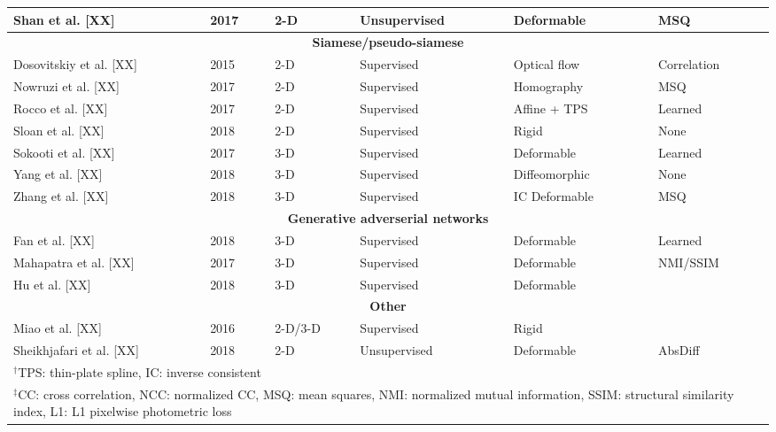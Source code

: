 \begin{table}[!htb]
\begin{tabular*}{\textwidth}{l@{\extracolsep{\fill}}l@{\extracolsep{\fill}}l@{\extracolsep{\fill}}l@{\extracolsep{\fill}}l@{\extracolsep{\fill}}l}
  Shan et al. [XX] & 2017 & 2-D & Unsupervised & Deformable & MSQ \\
\midrule
\multicolumn{6}{c}{\textbf{Siamese/pseudo-siamese}}
  \vspace{0.25cm} \\
  Dosovitskiy et al. [XX] & 2015 & 2-D & Supervised & Optical flow & Correlation \\
  Nowruzi et al. [XX] & 2017 & 2-D & Supervised & Homography & MSQ \\
  Rocco et al. [XX] & 2017 & 2-D & Supervised & Affine + TPS & Learned \\
  Sloan et al. [XX] & 2018 & 2-D & Supervised & Rigid & None \\  %
  Sokooti et al. [XX] & 2017 & 3-D & Supervised & Deformable & Learned \\
  Yang et al. [XX] & 2018 & 3-D & Supervised & Diffeomorphic & None \\  %
  Zhang et al. [XX] & 2018 & 3-D & Supervised & IC Deformable & MSQ \\
\midrule
\multicolumn{6}{c}{\textbf{Generative adverserial networks}}
  \vspace{0.25cm} \\
  Fan et al. [XX] & 2018 & 3-D & Supervised & Deformable & Learned \\
  Mahapatra et al. [XX] & 2017 & 3-D & Supervised & Deformable & NMI/SSIM \\
  Hu et al. [XX] & 2018 & 3-D & Supervised & Deformable & {} \\
\midrule
\multicolumn{6}{c}{\textbf{Other}}
  \vspace{0.25cm} \\
  Miao et al. [XX] & 2016 & 2-D/3-D & Supervised & Rigid & {} \\
  Sheikhjafari et al. [XX] & 2018 & 2-D & Unsupervised & Deformable & AbsDiff \\
\bottomrule
\multicolumn{6}{l}{
  \begin{minipage}[t]{0.9\columnwidth}%
    \footnotesize{$^\dagger$TPS: thin-plate spline, IC: inverse consistent}
  \end{minipage}
  } \\
\multicolumn{6}{l}{
  \begin{minipage}[t]{0.9\columnwidth}%
    \footnotesize{$^\ddagger$CC: cross correlation, NCC: normalized CC, MSQ: mean squares,
      NMI:  normalized mutual information, SSIM:  structural similarity index,
      L1:  L1 pixelwise photometric loss}
  \end{minipage}
  }
\end{tabular*}
\end{table}

